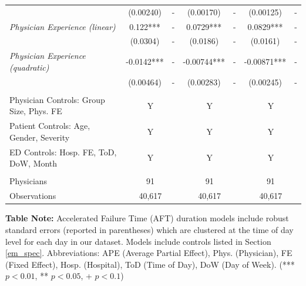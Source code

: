 \begin{table}[htbp]
{\begin{threeparttable}[t]
\begin{tabular}{lcccccc}
          & (0.00240) & \textcolor[rgb]{ .749,  .749,  .749}{-} & (0.00170) & \textcolor[rgb]{ .749,  .749,  .749}{-} & (0.00125) & \textcolor[rgb]{ .749,  .749,  .749}{-} \\
    \textit{Physician Experience (linear)} & 0.122*** & \textcolor[rgb]{ .749,  .749,  .749}{-} & 0.0729*** & \textcolor[rgb]{ .749,  .749,  .749}{-} & 0.0829*** & \textcolor[rgb]{ .749,  .749,  .749}{-} \\
          & (0.0304) & \textcolor[rgb]{ .749,  .749,  .749}{-} & (0.0186) & \textcolor[rgb]{ .749,  .749,  .749}{-} & (0.0161) & \textcolor[rgb]{ .749,  .749,  .749}{-} \\
    \textit{Physician Experience (quadratic)} & -0.0142*** & \textcolor[rgb]{ .749,  .749,  .749}{-} & -0.00744*** & \textcolor[rgb]{ .749,  .749,  .749}{-} & -0.00871*** & \textcolor[rgb]{ .749,  .749,  .749}{-} \\
          & (0.00464) & \textcolor[rgb]{ .749,  .749,  .749}{-} & (0.00283) & \textcolor[rgb]{ .749,  .749,  .749}{-} & (0.00245) & \textcolor[rgb]{ .749,  .749,  .749}{-} \\
          &       &       &       &       &       &  \\
    Physician Controls: Group Size, Phys. FE & \multicolumn{2}{c}{Y} & \multicolumn{2}{c}{Y} & \multicolumn{2}{c}{Y} \\
    Patient Controls: Age, Gender, Severity & \multicolumn{2}{c}{Y} & \multicolumn{2}{c}{Y} & \multicolumn{2}{c}{Y} \\
    ED Controls: Hosp. FE, ToD, DoW, Month & \multicolumn{2}{c}{Y} & \multicolumn{2}{c}{Y} & \multicolumn{2}{c}{Y} \\
          &       &       &       &       &       &  \\
    Physicians & \multicolumn{2}{c}{91} & \multicolumn{2}{c}{91} & \multicolumn{2}{c}{91} \\
    Observations & \multicolumn{2}{c}{                           40,617 } & \multicolumn{2}{c}{                             40,617 } & \multicolumn{2}{c}{                             40,617 } \\
    \end{tabular}%
    \medskip
    \begin{tablenotes}
      \footnotesize
      \item \textbf{Table Note:} Accelerated Failure Time (AFT) duration models include robust standard errors (reported in parentheses) which are clustered at the time of day level for each day in our dataset. Models include controls listed in Section \ref{em_spec}. Abbreviations: APE (Average Partial Effect), Phys. (Physician), FE (Fixed Effect), Hosp. (Hospital), ToD (Time of Day), DoW (Day of Week).  (*** $p < 0.01$, ** $p < 0.05$, + $p < 0.1$)
    \end{tablenotes}
  \label{tab:H3H5}
  \end{threeparttable} }
 \end{table}

